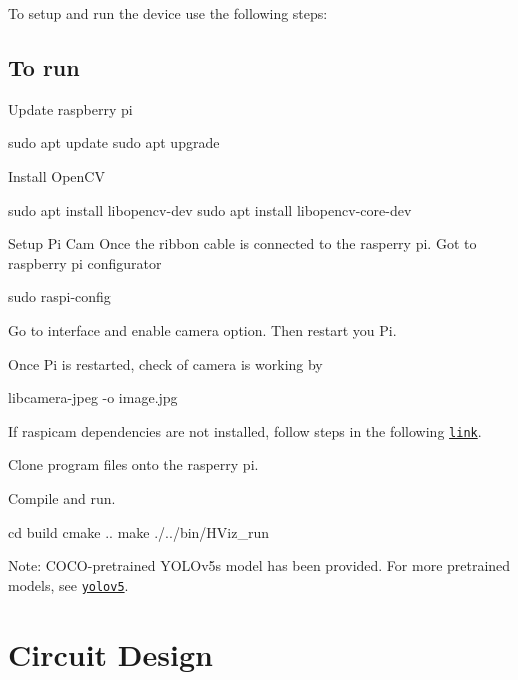 To setup and run the device use the following steps\+:



\subsection*{To run}


\begin{DoxyEnumerate}
\item Update raspberry pi 
\begin{DoxyCode}
sudo apt update
sudo apt upgrade
\end{DoxyCode}

\item Install Open\+CV 
\begin{DoxyCode}
sudo apt install libopencv-dev
sudo apt install libopencv-core-dev
\end{DoxyCode}

\item Setup Pi Cam Once the ribbon cable is connected to the rasperry pi. Got to raspberry pi configurator 
\begin{DoxyCode}
sudo raspi-config
\end{DoxyCode}

\item Go to interface and enable camera option. Then restart you Pi.
\item Once Pi is restarted, check of camera is working by 
\begin{DoxyCode}
libcamera-jpeg -o image.jpg
\end{DoxyCode}

\item If raspicam dependencies are not installed, follow steps in the following \href{https://github.com/cedricve/raspicam}{\tt link}.
\item Clone program files onto the rasperry pi.
\item Compile and run. 
\begin{DoxyCode}
cd build
cmake ..
make
./../bin/HViz\_run
\end{DoxyCode}

\end{DoxyEnumerate}

Note\+: C\+O\+C\+O-\/pretrained Y\+O\+L\+Ov5s model has been provided. For more pretrained models, see \href{https://github.com/ultralytics/yolov5}{\tt yolov5}.

\section*{Circuit Design}

 